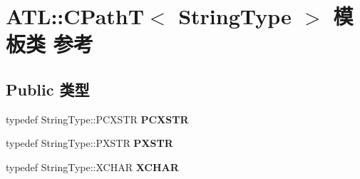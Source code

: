 \hypertarget{class_a_t_l_1_1_c_path_t}{}\section{A\+TL\+:\+:C\+PathT$<$ String\+Type $>$ 模板类 参考}
\label{class_a_t_l_1_1_c_path_t}
\subsection*{Public 类型}
\begin{DoxyCompactItemize}
\item 
\mbox{\label{class_a_t_l_1_1_c_path_t_ace5142648cd7c2d4bc4003a96f430168}} 
typedef String\+Type\+::\+P\+C\+X\+S\+TR {\bfseries P\+C\+X\+S\+TR}
\item 
\mbox{\label{class_a_t_l_1_1_c_path_t_aa0dfddd7caa9a0e87dc5451d6a8b6aa3}} 
typedef String\+Type\+::\+P\+X\+S\+TR {\bfseries P\+X\+S\+TR}
\item 
\mbox{\label{class_a_t_l_1_1_c_path_t_a610a32cd2f6cb6aa4758880e1a99f22b}} 
typedef String\+Type\+::\+X\+C\+H\+AR {\bfseries X\+C\+H\+AR}
\end{DoxyCompactItemize}

